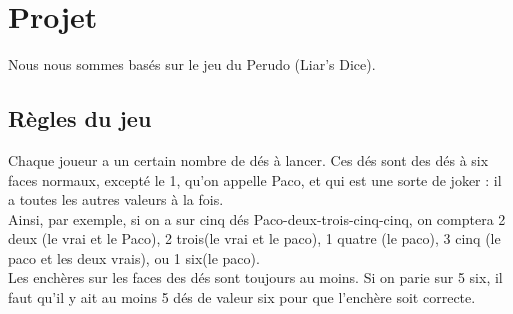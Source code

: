 \documentclass[a4paper, 11pt]{article}
\begin{document}
\section{Projet}
Nous nous sommes basés sur le jeu du Perudo (Liar's Dice).

\subsection{Règles du jeu}
Chaque joueur a un certain nombre de dés à lancer.  Ces dés sont des dés à six
faces normaux, excepté le 1, qu'on appelle Paco, et qui est une sorte de joker :
il a toutes les autres valeurs à la fois.
\\
Ainsi, par exemple, si on a sur
cinq dés Paco-deux-trois-cinq-cinq, on comptera 2 deux (le vrai et le Paco), 2
trois(le vrai et le paco), 1 quatre (le paco), 3 cinq (le paco et les deux
vrais), ou 1 six(le paco).
\\
Les enchères sur les faces des dés sont toujours au moins. Si on parie sur 5
six, il faut qu'il y ait au moins 5 dés de valeur six pour que l'enchère soit
correcte.
\end{document}
